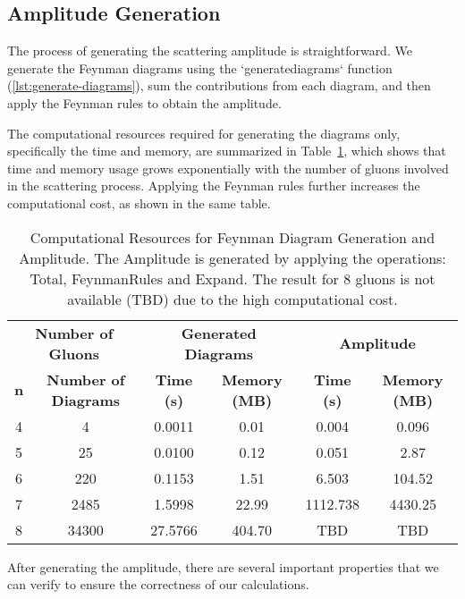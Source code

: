 \documentclass[main.tex]{subfiles}
\begin{document}
\subsection{Amplitude Generation}

The process of generating the scattering amplitude is straightforward. We generate the Feynman diagrams using the `generatediagrams` function (\cref{lst:generate-diagrams}), sum 
the contributions from each diagram, and then apply the Feynman rules to obtain the amplitude. 

The computational resources required for generating the diagrams only, specifically the time and memory, are summarized in Table~\ref{tab:computational-resources},
which shows that time and memory usage grows exponentially with the number of gluons involved in the scattering process.
Applying the Feynman rules further increases the computational cost, as shown in the same table.


\begin{table}[htbp]
    \centering
    \caption{Computational Resources for Feynman Diagram Generation and Amplitude. The Amplitude
    is generated by applying the operations: Total, FeynmanRules and Expand. The result for 
    8 gluons is not available (TBD) due to the high computational cost.} 
    \label{tab:computational-resources}
    \begin{tabular}{|c|c|c|c|c|c|}
        \hline
        \multicolumn{2}{|c|}{\textbf{Number of Gluons}} & \multicolumn{2}{|c|}{\textbf{Generated Diagrams}} & \multicolumn{2}{|c|}{\textbf{Amplitude}} \\
        \cline{1-6} %
        \textbf{n} & \textbf{Number of Diagrams} & \textbf{Time (s)} & \textbf{Memory (MB)} & \textbf{Time (s)} & \textbf{Memory (MB)} \\
        \hline
        4 & 4 & 0.0011 & 0.01 & 0.004 & 0.096 \\
        5 & 25 & 0.0100 & 0.12 & 0.051 & 2.87 \\
        6 & 220 & 0.1153 & 1.51 & 6.503 & 104.52 \\
        7 & 2485 & 1.5998 & 22.99 & 1112.738 & 4430.25 \\
        8 & 34300 & 27.5766 & 404.70 & TBD & TBD \\
        \hline
    \end{tabular}
\end{table}

After generating the amplitude, there are several important properties that we can verify to ensure the correctness of our calculations.
\end{document}
